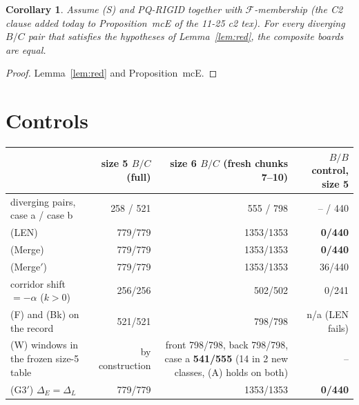\documentclass[11pt]{article}
\newtheorem{corollary}[theorem]{Corollary}
\theoremstyle{definition}\newtheorem{definition}[theorem]{Definition}\newtheorem{remark}[theorem]{Remark}
\begin{document}
\begin{corollary}
Assume (S) and PQ-RIGID together with $\mathcal F$-membership (the C2 clause added today to Proposition~mcE of the 11-25 c2 tex). For every diverging $B/C$ pair that satisfies the hypotheses of Lemma~\ref{lem:red}, the composite boards are equal.
\end{corollary}
\begin{proof}
Lemma~\ref{lem:red} and Proposition~mcE.
\end{proof}

\section{Controls}\label{sec:ctl}
\begin{center}\small\begin{tabular}{lrrr}\toprule
& size 5 $B/C$ (full) & size 6 $B/C$ (fresh chunks 7--10) & $B/B$ control, size 5\\\midrule
diverging pairs, case a / case b & 258 / 521 & 555 / 798 & -- / 440\\
(LEN) & 779/779 & 1353/1353 & \textbf{0/440}\\
(Merge) & 779/779 & 1353/1353 & \textbf{0/440}\\
(Merge$'$) & 779/779 & 1353/1353 & 36/440\\
corridor shift $=-\alpha$ ($k>0$) & 256/256 & 502/502 & 0/241\\
(F) and (Bk) on the record & 521/521 & 798/798 & n/a (LEN fails)\\
(W) windows in the frozen size-5 table & by construction & front 798/798, back 798/798, case a \textbf{541/555} (14 in 2 new classes, (A) holds on both) & --\\
(G3$'$) $\Delta_E=\Delta_L$ & 779/779 & 1353/1353 & \textbf{0/440}\\\bottomrule
\end{tabular}\end{center}
\end{document}
